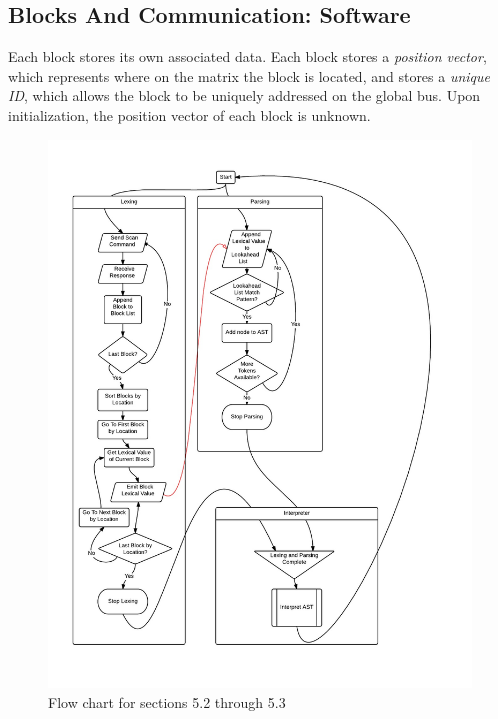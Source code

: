   \subsection{Blocks And Communication: Software}
    Each block stores its own associated data. Each block stores a \textit{position vector}, which represents where on the matrix the block is located, and stores a \textit{unique ID}, which allows the block to be uniquely addressed on the global bus. Upon initialization, the position vector of each block is unknown.
   \begin{figure}[H]
   \centering
    \includegraphics[width=6in]{central_processor_stages}
    \caption{Flow chart for sections 5.2 through 5.3}
   \end{figure}
   

